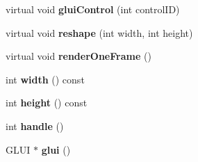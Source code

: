 \begin{DoxyCompactItemize}
\item 
virtual void {\bfseries glui\+Control} (int control\+ID)\hypertarget{classBaseGfxApp_a2978a7c358794c67df73b66776b2cef3}{}\label{classBaseGfxApp_a2978a7c358794c67df73b66776b2cef3}

\item 
virtual void {\bfseries reshape} (int width, int height)\hypertarget{classBaseGfxApp_a5d8d5d778a8aecd7f5f8e9c87f4c3d20}{}\label{classBaseGfxApp_a5d8d5d778a8aecd7f5f8e9c87f4c3d20}

\item 
virtual void {\bfseries render\+One\+Frame} ()\hypertarget{classBaseGfxApp_ad667534069c50951121968a2027b58e2}{}\label{classBaseGfxApp_ad667534069c50951121968a2027b58e2}

\item 
int {\bfseries width} () const \hypertarget{classBaseGfxApp_ace089a1a94fb6bb0bc17e1b7fa48e05d}{}\label{classBaseGfxApp_ace089a1a94fb6bb0bc17e1b7fa48e05d}

\item 
int {\bfseries height} () const \hypertarget{classBaseGfxApp_aa253dbe16a20c40e0a1bf8ff942ceea3}{}\label{classBaseGfxApp_aa253dbe16a20c40e0a1bf8ff942ceea3}

\item 
int {\bfseries handle} ()\hypertarget{classBaseGfxApp_ae9779f948eff6f45beec08091e98a803}{}\label{classBaseGfxApp_ae9779f948eff6f45beec08091e98a803}

\item 
G\+L\+UI $\ast$ {\bfseries glui} ()\hypertarget{classBaseGfxApp_ac721a0fedce80308c5c0e5695016e95d}{}\label{classBaseGfxApp_ac721a0fedce80308c5c0e5695016e95d}

\end{DoxyCompactItemize}
